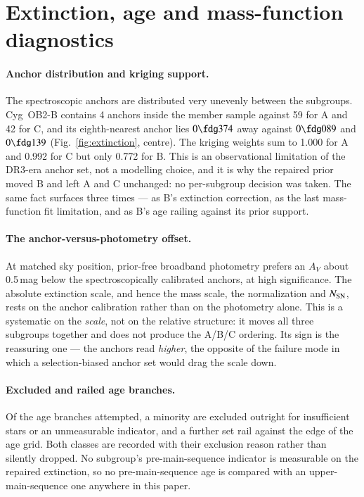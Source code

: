 \documentclass{aa}
\begin{document}
\section{Extinction, age and mass-function diagnostics}\label{app:diagnostics}

\paragraph{Anchor distribution and kriging support.}
The spectroscopic anchors are distributed very unevenly between the subgroups.
Cyg~OB2-B contains 4 anchors inside the member sample against 59 for A and 42
for C, and its eighth-nearest anchor lies $0\fdg374$ away against $0\fdg089$ and
$0\fdg139$ (Fig.~\ref{fig:extinction}, centre). The kriging weights sum to 1.000
for A and 0.992 for C but only 0.772 for B. This is an observational limitation
of the DR3-era anchor set, not a modelling choice, and it is why the repaired
prior moved B and left A and C unchanged: no per-subgroup decision was taken.
The same fact surfaces three times --- as B's extinction correction, as the last
mass-function fit limitation, and as B's age railing against its prior support.

\paragraph{The anchor-versus-photometry offset.}
At matched sky position, prior-free broadband photometry prefers an $A_V$ about
0.5\,mag below the spectroscopically calibrated anchors, at high significance.
The absolute extinction scale, and hence the mass scale, the normalization and
$N_{\rm SN}$, rests on the anchor calibration rather than on the photometry
alone. This is a systematic on the \emph{scale}, not on the relative structure:
it moves all three subgroups together and does not produce the A/B/C ordering.
Its sign is the reassuring one --- the anchors read \emph{higher}, the opposite
of the failure mode in which a selection-biased anchor set would drag the scale
down.

\paragraph{Excluded and railed age branches.}
Of the age branches attempted, a minority are excluded outright for
insufficient stars or an unmeasurable indicator, and a further set rail against
the edge of the age grid. Both classes are recorded with their exclusion reason
rather than silently dropped. No subgroup's pre-main-sequence indicator is
measurable on the repaired extinction, so no pre-main-sequence age is compared
with an upper-main-sequence one anywhere in this paper.
\end{document}
